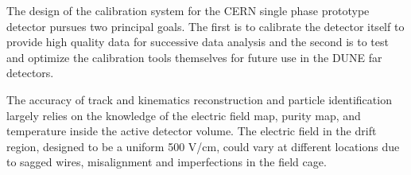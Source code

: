 \label{calibration}
The design of the calibration system for the CERN single phase prototype detector pursues two principal goals. The first is to calibrate the detector itself to
provide high quality data for successive data analysis and the second is to test and optimize the calibration tools themselves for future
use in the DUNE far detectors.

The accuracy of track and kinematics reconstruction and particle identification largely relies on the knowledge of the electric field map, purity map, and temperature inside the active detector volume. The electric field in the drift region, designed to be a uniform 500 V/cm, could vary at different locations due to sagged wires, misalignment and imperfections in the field cage. 


